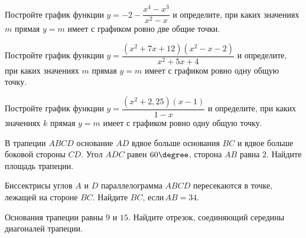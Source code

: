 \begin{class}[number=5]
	\begin{listofex}
		\item Постройте график функции \( y=-2-\dfrac{x^4-x^3}{x^2-x} \) и определите, при каких значениях \( m \) прямая \( y=m \) имеет с графиком ровно две общие точки.
		\item Постройте график функции \( y=\dfrac{(x^2+7x+12)(x^2-x-2)}{x^2+5x+4} \) и определите, при каких значениях \( m \) прямая \( y=m \) имеет с графиком ровно одну общую точку.
		\item Постройте график функции \( y=\dfrac{(x^2+2,25)(x-1)}{1-x} \) и определите, при каких значениях \( k \) прямая \( y=m \) имеет с графиком ровно одну общую точку.
		\item В трапеции \( ABCD \) основание \( AD \) вдвое больше основания \( BC \) и вдвое больше боковой стороны \( CD \). Угол \( ADC \) равен \( 60\degree \), сторона \( AB \) равна \( 2 \). Найдите площадь трапеции.
		\item Биссектрисы углов \( A \) и \( D \) параллелограмма \( ABCD \) пересекаются в точке, лежащей на стороне \( BC \). Найдите \( BC \), если \( AB=34 \).
		\item Основания трапеции равны \( 9 \) и \( 15 \). Найдите отрезок, соединяющий середины диагоналей трапеции.
	\end{listofex}
\end{class}

